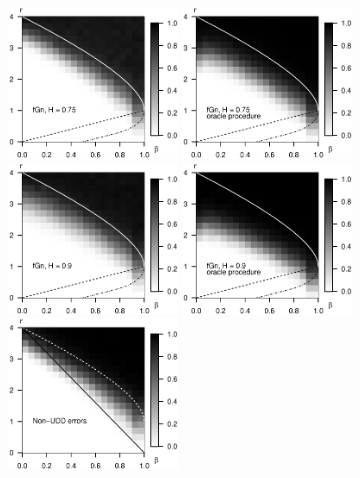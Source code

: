\begin{figure}
    \centering
    \includegraphics[width=0.4\textwidth]{./figures/simulated_phase_diagram_fGn075_p10000.eps}
    \includegraphics[width=0.4\textwidth]{./figures/simulated_phase_diagram_fGn075_p10000_oracle.eps}
    \includegraphics[width=0.4\textwidth]{./figures/simulated_phase_diagram_fGn09_p10000.eps}
    \includegraphics[width=0.4\textwidth]{./figures/simulated_phase_diagram_fGn09_p10000_oracle.eps}
    \includegraphics[width=0.4\textwidth]{./figures/simulated_phase_diagram_block_structure_p10000_agnostic7.eps}

\end{figure}
